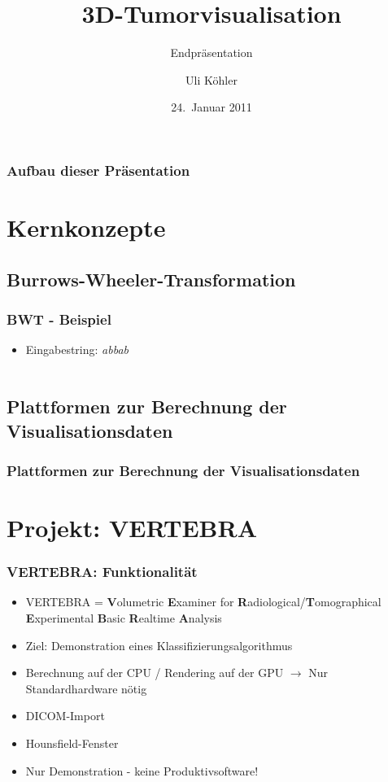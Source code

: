 \documentclass[14pt]{beamer}
\title{3D-Tumorvisualisation}
\subtitle{Endpräsentation}
\author{Uli Köhler}
\institute[EMG]{Ernst-Mach-Gymnasium Haar}
\date{24.~Januar 2011}
\begin{document}
\frame{\titlepage}
\begin{frame}
\frametitle{Aufbau dieser Präsentation}
\tableofcontents
\end{frame}

\section{Kernkonzepte}
\subsection{Burrows-Wheeler-Transformation}
\begin{frame}[allowframebreaks]
 \frametitle{BWT - Beispiel}
    \begin{itemize}
	\item Eingabestring: \textit{abbab}
    \end{itemize}
    \begin{tabular}{cccccc}
    \end{tabular}
    
\end{frame}
\subsection{Plattformen zur Berechnung der Visualisationsdaten}
\begin{frame}
 \frametitle{Plattformen zur Berechnung der Visualisationsdaten}
\vspace{8mm}	
 \begin{center}
 \end{center}
\end{frame}

%
%
%
\section{Projekt: VERTEBRA}
\begin{frame}
\frametitle{VERTEBRA: Funktionalität}
\begin{itemize}
 \item VERTEBRA = \textbf{V}olumetric \textbf{E}xaminer for \textbf{R}adiological/\textbf{T}omographical \textbf{E}xperimental \textbf{B}asic \textbf{R}ealtime \textbf{A}nalysis
 \item Ziel: Demonstration eines Klassifizierungsalgorithmus
 \item Berechnung auf der CPU / Rendering auf der GPU $\rightarrow$ Nur Standardhardware nötig
 \item DICOM-Import
 \item Hounsfield-Fenster
 \item Nur Demonstration - keine Produktivsoftware!
\end{itemize}
\end{frame}
%
%
\end{document}
